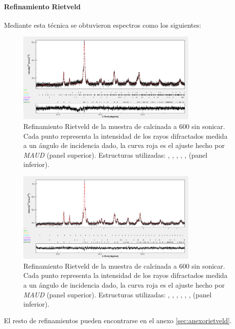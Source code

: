 \documentclass[../main.tex]{subfiles}
\begin{document}
\paragraph{Refinamiento Rietveld}
Mediante esta técnica se obtuvieron espectros como los siguientes:
\begin{figure}[H]
    \centering
    \includegraphics[width=0.8\textwidth]{fig/DRX600NdFeO3.png}
    \caption{Refinamiento Rietveld de la muestra de \neod{} calcinada a 600\gradoC{} sin sonicar. Cada punto representa la intensidad de los rayos difractados medida a un ángulo de incidencia dado, la curva roja es el ajuste hecho por \textit{MAUD} (panel superior). Estructuras utilizadas: \neod{} \cite{ndfeo3},  \cite{ndoh3},  \cite{feoh2},  \cite{nd2o3},  \cite{fe2o3},  \cite{feo} (panel inferior).}
    \label{fig:rietveld600ndresultados}
\end{figure}
\begin{figure}[H]
    \centering
    \includegraphics[width=0.8\textwidth]{fig/DRX700SmFeO3.png}
    \caption{Refinamiento Rietveld de la muestra de \neod{} calcinada a 600\gradoC{} sin sonicar. Cada punto representa la intensidad de los rayos difractados medida a un ángulo de incidencia dado, la curva roja es el ajuste hecho por \textit{MAUD} (panel superior). Estructuras utilizadas: \sama{} \cite{smfeo3},  \cite{smoh3},  \cite{feoh2},  \cite{sm2o3},  \cite{fe2o3},  \cite{smo},  \cite{feo} (panel inferior).}
    \label{fig:rietveld700smresultados}
\end{figure}
El resto de refinamientos pueden encontrarse en el anexo \ref{sec:anexorietveld}.
\end{document}
